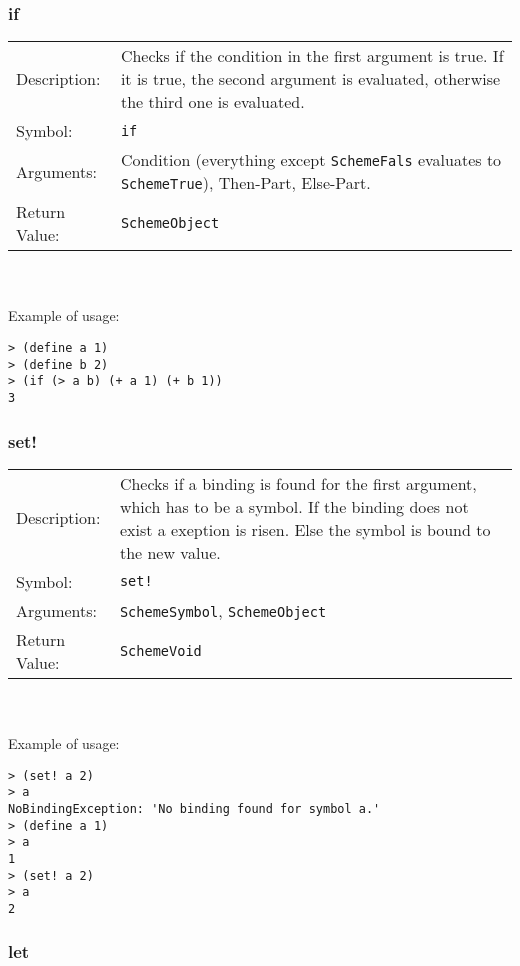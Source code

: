 \documentclass[12pt,a4paper]{scrartcl}
\begin{document}
\subsubsection*{if}
\begin{tabular}{l  p{13cm}}
Description: & Checks if the condition in the first argument is true. If it is true, the second argument is evaluated, otherwise the third one is evaluated. \\
Symbol: & \lstinline{if}\\
Arguments: & Condition (everything except \lstinline{SchemeFals} evaluates to \lstinline{SchemeTrue}), Then-Part, Else-Part. \\
Return Value: & \lstinline{SchemeObject}\\
\end{tabular}
\\
\\
Example of usage:
\begin{lstlisting}
> (define a 1)
> (define b 2)
> (if (> a b) (+ a 1) (+ b 1))
3
\end{lstlisting}

\subsubsection*{set!}
\begin{tabular}{l  p{13cm}}
Description: & Checks if a binding is found for the first argument, which has to be a symbol. If the binding does not exist a exeption is risen. Else the symbol is bound to the new value. \\
Symbol: & \lstinline{set!}\\
Arguments: & \lstinline{SchemeSymbol}, \lstinline{SchemeObject} \\
Return Value: & \lstinline{SchemeVoid}\\
\end{tabular}
\\
\\
Example of usage:
\begin{lstlisting}
> (set! a 2)
> a
NoBindingException: 'No binding found for symbol a.'
> (define a 1)
> a
1
> (set! a 2)
> a
2
\end{lstlisting}

\subsubsection*{let}
\end{document}
